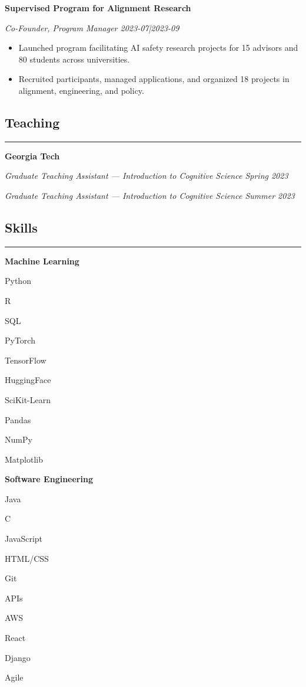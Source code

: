 \documentclass{article}
\newcommand{\headingOne}[1]{
    \subsection*{#1} \hrule
    \vspace*{6pt}
}
\newcommand{\headingTwo}[2]{
    \vspace*{6pt}
    \textbf{#1 \hfill #2}
}
\newcommand{\headingThree}[2]{
    \vspace*{2pt}
    \textsl{#1 \hfill #2}
}
\newcommand{\headingList}[1]{\vspace*{5pt}\textbf{#1}}
\begin{document}
\headingTwo{Supervised Program for Alignment Research}{}

\headingThree{Co-Founder, Program Manager}{2023-07|2023-09}
\begin{itemize}
    \item Launched program facilitating AI safety research projects for 15 advisors and 80 students across universities.
    \item Recruited participants, managed applications, and organized 18 projects in alignment, engineering, and policy.
\end{itemize}


\headingOne{Teaching}


\headingTwo{Georgia Tech}{}

\headingThree{Graduate Teaching Assistant — Introduction to Cognitive Science}{Spring 2023}

\headingThree{Graduate Teaching Assistant — Introduction to Cognitive Science}{Summer 2023}


\headingOne{Skills}

\headingList{Machine Learning}
\begin{itemize*}[label=$|$]
    \item Python
    \item R
    \item SQL
    \item PyTorch
    \item TensorFlow
    \item HuggingFace
    \item SciKit-Learn
    \item Pandas
    \item NumPy
    \item Matplotlib
\end{itemize*}

\headingList{Software Engineering}
\begin{itemize*}[label=$|$]
    \item Java
    \item C
    \item JavaScript 
    \item HTML/CSS 
    \item Git
    \item APIs
    \item AWS
    \item React
    \item Django
    \item Agile
\end{itemize*}
\end{document}
